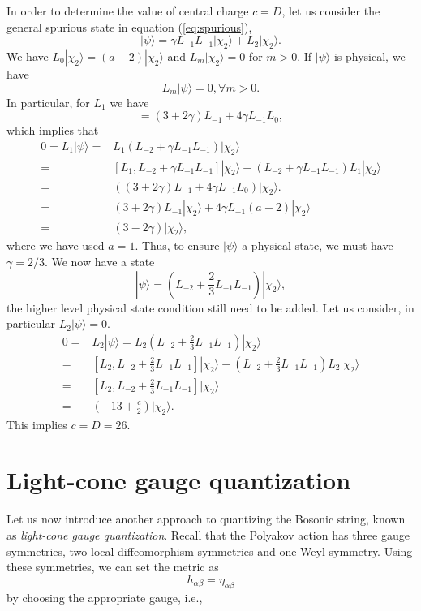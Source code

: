 \documentclass[graybox,envcountchap,sectrefs]{svmono}
\begin{document}
In order to determine the value of central charge $c=D$, let us consider the general spurious state in equation (\ref{eq:spurious}),
\begin{equation}
|\psi\rangle=\gamma L_{-1}L_{-1}|\chi_2\rangle+L_2|\chi_2\rangle.	
\end{equation}
We have $L_{0}|\chi_2\rangle=(a-2)|\chi_2\rangle$ and $L_m|\chi_2\rangle=0$ for $m>0$.
If $|\psi\rangle$ is physical, we have
\begin{equation}
L_m|\psi\rangle=0, \forall m>0.	
\end{equation}
In particular, for $L_1$ we have
\begin{equation}
[L_1,L_{-2}+\gamma L_{-1}L_{-1}]= (3+2\gamma)L_{-1}+4\gamma L_{-1}L_0,
\end{equation}
which implies that
\begin{align}
0=L_1|\psi\rangle=& L_{1}(L_{-2}+\gamma L_{-1}L_{-1})|\chi_2\rangle \nonumber\\	
=& [L_1,L_{-2}+\gamma L_{-1}L_{-1}]|\chi_2\rangle+(L_{-2}+\gamma L_{-1}L_{-1})L_{1} |\chi_2\rangle \nonumber\\
=& \left( (3+2\gamma)L_{-1}+4\gamma L_{-1}L_0 \right)|\chi_2\rangle. \nonumber\\	
=&(3+2\gamma)L_{-1}|\chi_2\rangle+ 4\gamma L_{-1} (a-2)|\chi_2\rangle \nonumber\\
=&(3-2\gamma)|\chi_2\rangle,	
\end{align}
where we have used $a=1$.
Thus, to ensure $|\psi\rangle$ a physical state, we must have $\gamma=2/3$.
We now have a state
\begin{equation}
|\psi\rangle=(L_{-2}+\frac{2}{3}L_{-1}L_{-1})	|\chi_2\rangle,
\end{equation}
the higher level physical state condition still need to be 
added. Let us consider, in particular $L_2|\psi\rangle =0$.
\begin{align}
0 = &L_2	|\psi\rangle=L_2(L_{-2}+\frac{2}{3}L_{-1}L_{-1})	|\chi_2\rangle \nonumber\\
=& [L_2, L_{-2}+\frac{2}{3}L_{-1}L_{-1}]|\chi_2\rangle+(L_{-2}+\frac{2}{3}L_{-1}L_{-1})L_2 |\chi_2\rangle 
\nonumber\\
=&[L_2, L_{-2}+\frac{2}{3}L_{-1}L_{-1}]|\chi_2\rangle\nonumber\\
=&(-13 +\frac{c}{2})|\chi_2\rangle.
\end{align}
This implies  $c=D=26$.

\section{Light-cone gauge quantization}
Let us now introduce another approach to quantizing the Bosonic string, known as \emph{light-cone gauge quantization}. 
Recall that the Polyakov action has three gauge symmetries, two local diffeomorphism symmetries and one Weyl symmetry. Using these symmetries, we can set the metric as 
\begin{equation}
h_{\alpha\beta}=\eta_{\alpha\beta}	
\end{equation}
by choosing the appropriate gauge, i.e.,
\end{document}
